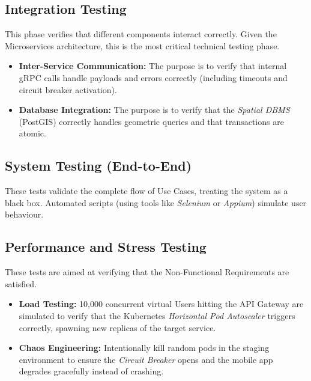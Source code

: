 \subsection*{Integration Testing}
This phase verifies that different components interact correctly. Given the Microservices architecture, this is the most critical technical testing phase.
\begin{itemize}
    \item \textbf{Inter-Service Communication:} The purpose is to verify that internal gRPC calls  handle payloads and errors correctly (including timeouts and circuit breaker activation).
    \item \textbf{Database Integration:} The purpose is to verify that the \emph{Spatial DBMS} (PostGIS) correctly handles geometric queries and that transactions are atomic.
\end{itemize}

\subsection*{System Testing (End-to-End)}
These tests validate the complete flow of Use Cases, treating the system as a black box. Automated scripts (using tools like \emph{Selenium} or \emph{Appium}) simulate user behaviour.

\subsection*{Performance and Stress Testing}
These tests are aimed at verifying that the Non-Functional Requirements are satisfied.
\begin{itemize}
    \item \textbf{Load Testing:} 10,000 concurrent virtual Users hitting the API Gateway are simulated to verify that the Kubernetes \emph{Horizontal Pod Autoscaler} triggers correctly, spawning new replicas of the target service.
    \item \textbf{Chaos Engineering:} Intentionally kill random pods in the staging environment to ensure the \emph{Circuit Breaker} opens and the mobile app degrades gracefully instead of crashing.
\end{itemize}

